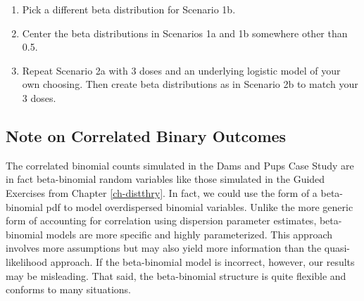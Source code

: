 \documentclass[
]{krantz}
\providecommand{\tightlist}{%
  \setlength{\itemsep}{0pt}\setlength{\parskip}{0pt}}
\begin{document}
\begin{enumerate}
\def\labelenumi{\alph{enumi}.}
\tightlist
\item
  Pick a different beta distribution for Scenario 1b.
\item
  Center the beta distributions in Scenarios 1a and 1b somewhere other than 0.5.
\item
  Repeat Scenario 2a with 3 doses and an underlying logistic model of your own choosing. Then create beta distributions as in Scenario 2b to match your 3 doses.
\end{enumerate}

\hypertarget{note-on-correlated-binary-outcomes}{%
\subsection{Note on Correlated Binary Outcomes}\label{note-on-correlated-binary-outcomes}}

The correlated binomial counts simulated in the Dams and Pups Case Study are in fact beta-binomial random variables like those simulated in the Guided Exercises from Chapter \ref{ch-distthry}. In fact, we could use the form of a beta-binomial pdf to model overdispersed binomial variables. Unlike the more generic form of accounting for correlation using dispersion parameter estimates, beta-binomial models are more specific and highly parameterized. This approach involves more assumptions but may also yield more information than the quasi-likelihood approach. If the beta-binomial model is incorrect, however, our results may be misleading. That said, the beta-binomial structure is quite flexible and conforms to many situations.

  

\backmatter
\printindex
\end{document}
